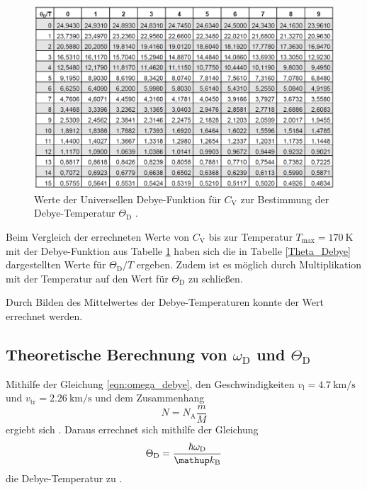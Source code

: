 \begin{figure}[!h]
	\centering
	\includegraphics[width = 14cm]{img/theta.png}
	\caption[]{Werte der Universellen Debye-Funktion für $C_\mathrm{V}$ zur Bestimmung der Debye-Temperatur $\Theta_\mathrm{D}$ \cite{V47}.}
	\label{Cv_global}
\end{figure}

Beim Vergleich der errechneten Werte von $C_\mathrm{V}$ bis zur Temperatur $T_\text{max} = \SI{170}{\kelvin}$ mit der Debye-Funktion aus Tabelle \ref{Cv_global} haben sich die in Tabelle \ref{Theta_Debye} dargestellten Werte für $\Theta_\text{D} / T$ ergeben.
Zudem ist es möglich durch Multiplikation mit der Temperatur auf den Wert für $\Theta_\text{D}$ zu schließen.

Durch Bilden des Mittelwertes der Debye-Temperaturen konnte der Wert  errechnet werden.
\FloatBarrier
\subsection{Theoretische Berechnung von $\omega_\mathrm{D}$ und $\Theta_\mathrm{D}$} %
\label{sub:theoretische_berechnung_von_omega_mathrm}

Mithilfe der Gleichung \eqref{eqn:omega_debye}, den Geschwindigkeiten $v_\text{l}=\SI{4.7}{\kilo\meter\per\second}$ und $v_\text{tr}=\SI{2.26}{\kilo\meter\per\second}$ und dem Zusammenhang
\begin{equation*}
	N = N_\text{A} \frac{m}{M}
\end{equation*}
ergiebt sich .
Daraus errechnet sich mithilfe der Gleichung
\begin{equation*}
	\Theta_\text{D} = \frac{\hbar \omega_\text{D}}{\kb}
\end{equation*}
die Debye-Temperatur zu .